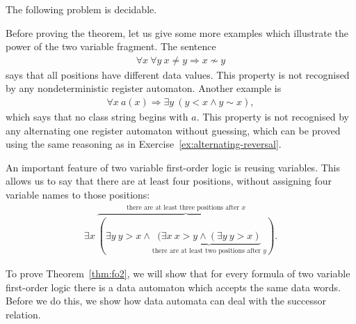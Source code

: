 \begin{theorem}\label{thm:fo2} The following problem is decidable. 
\end{theorem}

Before proving the theorem, let us give some more examples which illustrate the power of the two variable fragment. The sentence
\begin{align*}
	\forall x \ \forall y\ x \neq y \Rightarrow x \not \sim y
\end{align*}
 says that all positions have different data values. This property is not recognised by any nondeterministic register automaton. Another example is 
 \begin{align*}
	 \forall x \ a(x) \Rightarrow \exists y \ (y < x \land y \sim x),
 \end{align*}
 which says that no class string begins with $a$. This property is not recognised by any alternating one register automaton without guessing, which can be proved using the same reasoning as in Exercise~\ref{ex:alternating-reversal}.

 An important feature of two variable first-order logic is reusing variables. 
This allows us to say that there are at least four positions, without assigning four variable names to those positions:
\begin{align*}
	\exists x\ \overbrace{(\exists y \ y > x \land \underbrace{(\exists x \ x > y \land (\exists y \ y > x)}_{\text{there are at least two positions after $y$}})}^{\text{there are at least three positions after $x$}}.
\end{align*}


To prove Theorem~\ref{thm:fo2}, we will show that for every formula of two variable first-order logic there is a data automaton which accepts the same data words. Before we do this, we show how data automata can deal with the successor relation.

